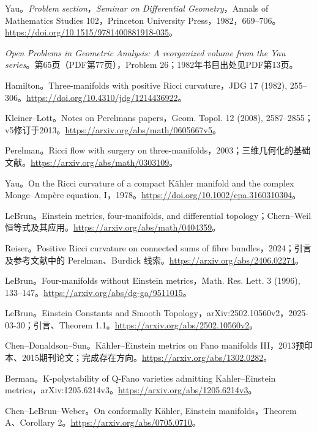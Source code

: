 \documentclass[11pt,a4paper]{article}
\theoremstyle{definition}
\begin{document}
\begin{enumerate}[label={[\arabic*]},leftmargin=2.2em,itemsep=0.55em]
\raggedright
\item Yau。\emph{Problem section}，\emph{Seminar on Differential Geometry}，Annals of Mathematics Studies 102，Princeton University Press，1982，669--706。\url{https://doi.org/10.1515/9781400881918-035}。
\item \emph{Open Problems in Geometric Analysis: A reorganized volume from the Yau series}。第65页（PDF第77页），Problem 26；1982年书目出处见PDF第13页。
\item Hamilton。Three-manifolds with positive Ricci curvature，JDG 17 (1982), 255--306。\url{https://doi.org/10.4310/jdg/1214436922}。
\item Kleiner--Lott。Notes on Perelman\textquotesingle s papers，Geom. Topol. 12 (2008), 2587--2855；v5修订于2013。\url{https://arxiv.org/abs/math/0605667v5}。
\item Perelman。Ricci flow with surgery on three-manifolds，2003；三维几何化的基础文献。\url{https://arxiv.org/abs/math/0303109}。
\item Yau。On the Ricci curvature of a compact Kähler manifold and the complex Monge--Ampère equation, I，1978。\url{https://doi.org/10.1002/cpa.3160310304}。
\item LeBrun。Einstein metrics, four-manifolds, and differential topology；Chern--Weil 恒等式及其应用。\url{https://arxiv.org/abs/math/0404359}。
\item Reiser。Positive Ricci curvature on connected sums of fibre bundles，2024；引言及参考文献中的 Perelman、Burdick 线索。\url{https://arxiv.org/abs/2406.02274}。
\item LeBrun。Four-manifolds without Einstein metrics，Math. Res. Lett. 3 (1996), 133--147。\url{https://arxiv.org/abs/dg-ga/9511015}。
\item LeBrun。Einstein Constants and Smooth Topology，arXiv:2502.10560v2，2025-03-30；引言、Theorem 1.1。\url{https://arxiv.org/abs/2502.10560v2}。
\item Chen--Donaldson--Sun。Kähler--Einstein metrics on Fano manifolds III，2013预印本、2015期刊论文；完成存在方向。\url{https://arxiv.org/abs/1302.0282}。
\item Berman。K-polystability of Q-Fano varieties admitting Kahler--Einstein metrics，arXiv:1205.6214v3。\url{https://arxiv.org/abs/1205.6214v3}。
\item Chen--LeBrun--Weber。On conformally Kähler, Einstein manifolds，Theorem A、Corollary 2。\url{https://arxiv.org/abs/0705.0710}。

\end{enumerate}
\end{document}
